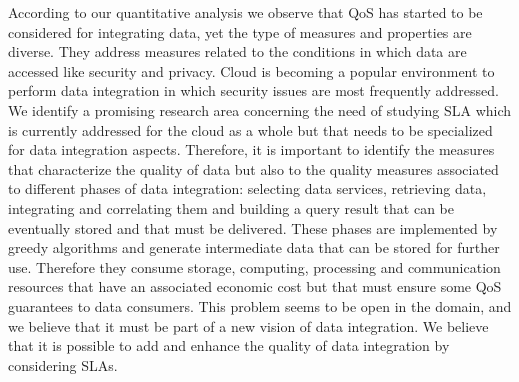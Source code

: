 According to our quantitative analysis we observe that QoS has started to be considered for integrating data, yet the type of measures and properties are diverse. They address measures related to the conditions in which data are accessed like security and privacy. Cloud is becoming a popular environment to perform data integration in which security issues are most frequently addressed. We identify a promising research area concerning the need of studying SLA which is currently addressed  for the cloud as a whole \cite{PedrinaciCL14} but that needs to be specialized for data integration aspects. Therefore, it is important to identify the measures that characterize the quality of data but also to the quality measures associated to different phases of data integration: selecting data services, retrieving data, integrating and correlating them and building a query result that can be eventually stored and that must be delivered. These phases are implemented by greedy algorithms and generate intermediate data that can be stored for further use. Therefore they consume storage, computing, processing and communication resources that have an associated economic cost but that must ensure some QoS guarantees to data consumers. This problem seems to be open in the domain, and we believe that it must be part of  a new vision of data integration. We believe that it is possible to add and enhance the quality of data integration by considering SLAs.


% 
